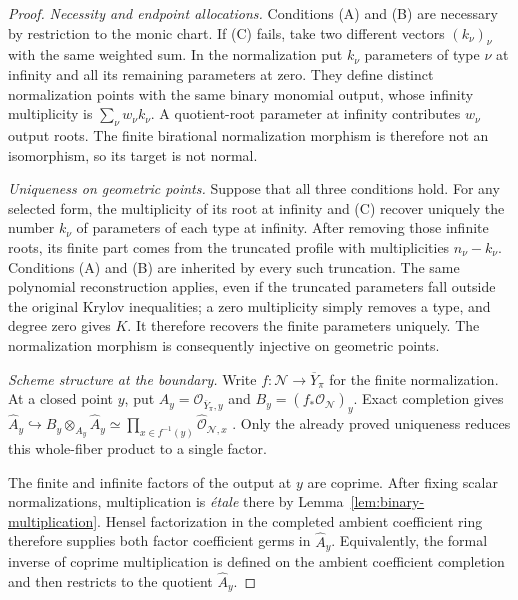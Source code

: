 \documentclass[10pt,fleqn]{article}
\numberwithin{equation}{section}
\begin{document}
\begin{proof}
\emph{Necessity and endpoint allocations.}
Conditions (A) and (B) are necessary by restriction to the monic
chart.  If (C) fails, take two different vectors $(k_\nu)_\nu$ with
the same weighted sum.  In the normalization put $k_\nu$ parameters
of type $\nu$ at infinity and all its remaining parameters at zero.
They define distinct normalization points with the same binary
monomial output, whose infinity multiplicity is
$\sum_\nu w_\nu k_\nu$.
A quotient-root parameter at infinity contributes $w_\nu$ output roots.
The finite birational normalization morphism is therefore not an
isomorphism, so its target is not normal.

\emph{Uniqueness on geometric points.}
Suppose that all three conditions hold.  For any selected
form, the multiplicity of its root at infinity and (C) recover
uniquely the number $k_\nu$ of parameters of each type at infinity.
After removing those infinite roots, its finite part comes from the
truncated profile with multiplicities $n_\nu-k_\nu$.  Conditions
(A) and (B) are inherited by every such truncation.  The same
polynomial reconstruction applies, even if the truncated parameters
fall outside the original Krylov inequalities; a zero multiplicity
simply removes a type, and degree zero gives $K$.
It therefore recovers the finite parameters uniquely.  The
normalization morphism is consequently injective on geometric
points.

\emph{Scheme structure at the boundary.}
Write $f:\mathcal N\to\overline Y_\pi$ for the finite normalization.
At a closed point $y$, put $A_y=\mathcal O_{\overline Y_\pi,y}$ and
$B_y=(f_*\mathcal O_{\mathcal N})_y$.  Exact completion gives
$\widehat A_y\hookrightarrow B_y\otimes_{A_y}\widehat A_y
\simeq\prod_{x\in f^{-1}(y)}\widehat{\mathcal O}_{\mathcal N,x}$
\cite[Tags 00MA and 07N9]{Stacks}.  Only the already proved uniqueness
reduces this whole-fiber product to a single factor.

The finite and infinite factors of the output at $y$ are coprime.
After fixing scalar normalizations, multiplication is \emph{\'etale}
there by Lemma~\ref{lem:binary-multiplication}.
Hensel factorization in the completed ambient coefficient ring
therefore supplies both factor coefficient germs in $\widehat A_y$.
Equivalently, the formal inverse of coprime multiplication is
defined on the ambient coefficient completion and then restricts
to the quotient $\widehat A_y$.


\end{proof}
\end{document}
